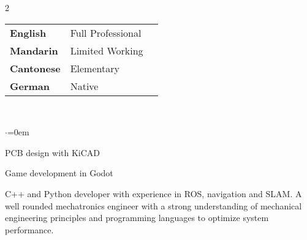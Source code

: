 \documentclass[grey]{hipstercv}
\newlength{\leftcolwidth}
\begin{document}
\begin{paracol}{2}
{\begin{minipage}[t]{0.3\textwidth}
\bigskip

\bigskip


\begin{minipage}[t]{\leftcolwidth}
\begin{tabular}{l | ll}
\textbf{English} & {\phantom{x}\footnotesize Full Professional} \\
\textbf{Mandarin} & {\phantom{x}\footnotesize Limited Working} \\
\textbf{Cantonese} & {\phantom{x}\footnotesize Elementary} \\
\textbf{German} & {\phantom{x}\footnotesize Native} \\
\end{tabular}
\end{minipage}

\bigskip

 \\

\begin{list}{$\cdot$}{\leftmargin=0em}\setlength{\itemsep}{-0.3em} \vspace{-0.5em}
    \item PCB design with KiCAD 
    \item Game development in Godot 
\end{list}

\bigskip





    
\end{minipage}






\phantom{turn the page}

\phantom{turn the page}
}
\switchcolumn

C++ and Python developer with experience in ROS, navigation and SLAM. A well rounded
mechatronics engineer with a strong understanding of mechanical engineering principles and programming languages to optimize system performance.
\small

\end{paracol}
\end{document}
